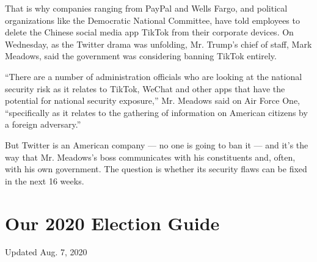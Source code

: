 That is why companies ranging from PayPal and Wells Fargo, and political
organizations like the Democratic National Committee, have told
employees to delete the Chinese social media app TikTok from their
corporate devices. On Wednesday, as the Twitter drama was unfolding, Mr.
Trump's chief of staff, Mark Meadows, said the government was
considering banning TikTok entirely.

``There are a number of administration officials who are looking at the
national security risk as it relates to TikTok, WeChat and other apps
that have the potential for national security exposure,'' Mr. Meadows
said on Air Force One, ``specifically as it relates to the gathering of
information on American citizens by a foreign adversary.''

But Twitter is an American company --- no one is going to ban it --- and
it's the way that Mr. Meadows's boss communicates with his constituents
and, often, with his own government. The question is whether its
security flaws can be fixed in the next 16 weeks.

\hypertarget{our-2020-election-guide}{%
\section{Our 2020 Election Guide}\label{our-2020-election-guide}}

Updated Aug. 7, 2020


